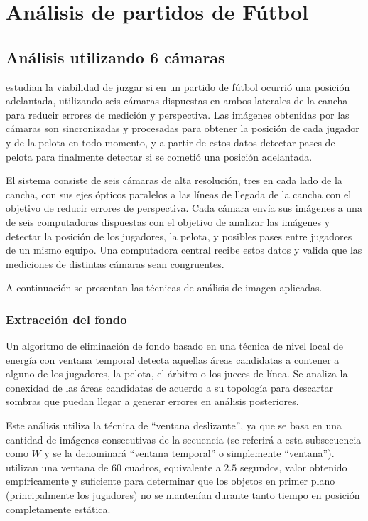\documentclass[a4paper,10pt]{article}
\begin{document}
\section{Análisis de partidos de Fútbol}
\label{sec:futbol}

\subsection{Análisis utilizando 6 cámaras}
\label{sec:6-camaras}

\citeauthor*{papers-tanos} estudian la viabilidad de juzgar si en un partido de fútbol
ocurrió una posición adelantada, utilizando seis cámaras dispuestas en ambos
laterales de la cancha para reducir errores de medición y perspectiva. Las
imágenes obtenidas por las cámaras son sincronizadas y procesadas para obtener
la posición de cada jugador y de la pelota en todo momento, y a partir de estos
datos detectar pases de pelota para finalmente detectar si se cometió una
posición adelantada.

El sistema consiste de seis cámaras de alta resolución, tres en cada lado de
la cancha, con sus ejes ópticos paralelos a las líneas de llegada de la cancha
con el objetivo de reducir errores de perspectiva. Cada cámara envía sus
imágenes a una de seis computadoras dispuestas con el objetivo de analizar las
imágenes y detectar la posición de los jugadores, la pelota, y posibles pases
entre jugadores de un mismo equipo. Una computadora central recibe estos datos y
valida que las mediciones de distintas cámaras sean congruentes.

A continuación se presentan las técnicas de análisis de imagen aplicadas.

\subsubsection{Extracción del fondo}
Un algoritmo de eliminación de fondo basado en una técnica de nivel local de
energía con ventana temporal detecta aquellas áreas candidatas a contener a
alguno de los jugadores, la pelota, el árbitro o los jueces de línea.
Se analiza la conexidad de las áreas candidatas de
acuerdo a su topología para descartar sombras que puedan llegar a generar
errores en análisis posteriores.

Este análisis utiliza la técnica de ``ventana deslizante'', ya que
se basa en una cantidad de imágenes consecutivas de la secuencia (se referirá a
esta subsecuencia como $W$ y se la denominará ``ventana temporal'' o simplemente
``ventana''). \citeauthor*{papers-tanos} utilizan una ventana de 60 cuadros,
equivalente a $2.5$ segundos, valor obtenido empíricamente y suficiente para
determinar que los objetos en primer plano (principalmente los jugadores) no
se mantenían durante tanto tiempo en posición completamente estática.
\end{document}
